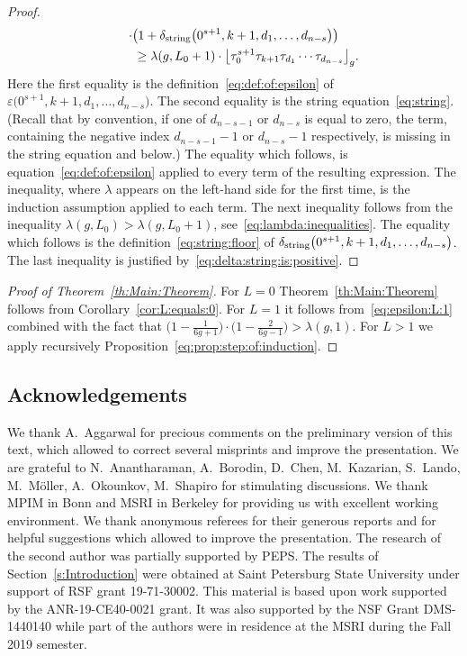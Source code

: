 \documentclass[pdftex]{sigma}
\renewcommand{\epsilon}{\varepsilon}
\theoremstyle{definition}
\begin{document}
\begin{proof}
\begin{gather*}
\cdot\big(1+\delta_{\rm string}\big(0^{s+1},k+1,d_1,\dots,d_{n-s}\big)\big)\\
\qquad{} \ge \lambda(g,L_0+1)
\cdot\big\lfloor\tau_0^{s+1}\tau_{k+1}\tau_{d_1}\cdots\tau_{d_{n-s}}\big\rfloor_g.
\end{gather*}
Here the first equality is the definition~\eqref{eq:def:of:epsilon} of $\epsilon\big(0^{s+1},k+1,d_1,\dots,d_{n-s}\big)$. The second equality is the string equation~\eqref{eq:string}.
(Recall that by convention, if one of $d_{n-s-1}$ or $d_{n-s}$ is equal to zero, the term, containing the negative index $d_{n-s-1}-1$ or $d_{n-s}-1$ respectively, is missing in the string equation and below.)
The equality which follows, is equation~\eqref{eq:def:of:epsilon} applied to every term of the resulting expression. The inequality, where $\lambda$ appears on the left-hand side for the first time, is the induction assumption applied to each term. The next inequality follows from the inequality $\lambda(g,L_0)>\lambda(g,L_0+1)$,
see~\eqref{eq:lambda:inequalities}. The equality which follows is the definition~\eqref{eq:string:floor} of $\delta_{\rm string}\big(0^{s+1},k+1,d_1,\dots,d_{n-s}\big)$. The last inequality is justified by~\eqref{eq:delta:string:is:positive}.
\end{proof}

\begin{proof}[Proof of Theorem~\ref{th:Main:Theorem}]
For $L=0$ Theorem~\ref{th:Main:Theorem} follows from
Corollary~\ref{cor:L:equals:0}. For $L=1$ it follows from~\eqref{eq:epsilon:L:1}
combined with the fact that $\big(1-\frac{1}{6g+1}\big)
\cdot\big(1-\frac{2}{6g-1}\big)>\lambda(g,1)$.
For $L>1$ we apply recursively Proposition~\ref{eq:prop:step:of:induction}.
\end{proof}

\subsection*{Acknowledgements}
We thank A.~Aggarwal for precious comments on the
preliminary version of this text, which allowed to correct
several misprints and improve the presentation.
We are grateful to N.~Anantharaman, A.~Borodin, D.~Chen,
M.~Kazarian, S.~Lando, M.~M\"oller, A.~Okounkov, M.~Shapiro
for stimulating discussions. We thank MPIM in Bonn and MSRI
in Berkeley for providing us with excellent working
environment.
We thank anonymous referees for their
generous reports and for helpful suggestions which allowed to
improve the presentation.
The research of the second author was partially supported
by PEPS. The results of Section~\ref{s:Introduction} were
obtained at Saint Petersburg State University under support
of RSF grant 19-71-30002. This material is based upon work
supported by the ANR-19-CE40-0021 grant. It was also
supported by the NSF Grant DMS-1440140 while part of the
authors were in residence at the MSRI during the Fall 2019
semester.
\end{document}
